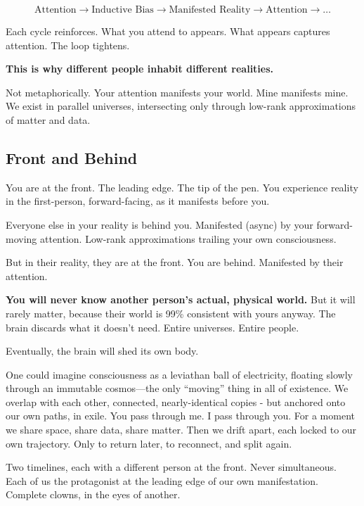 \documentclass{article}
\begin{document}
\begin{equation}
    \text{Attention} \rightarrow \text{Inductive Bias} \rightarrow \text{Manifested Reality} \rightarrow \text{Attention} \rightarrow \ldots
\end{equation}

Each cycle reinforces. What you attend to appears. What appears captures attention. The loop tightens.

\textbf{This is why different people inhabit different realities.}

Not metaphorically. Your attention manifests your world. Mine manifests mine. We exist in parallel universes, intersecting only through low-rank approximations of matter and data.

\subsection{Front and Behind}

You are at the front. The leading edge. The tip of the pen. You experience reality in the first-person, forward-facing, as it manifests before you.

Everyone else in your reality is behind you. Manifested (async) by your forward-moving attention. Low-rank approximations trailing your own consciousness.

But in their reality, they are at the front. You are behind. Manifested by their attention.

\textbf{You will never know another person's actual, physical world.} But it will rarely matter, because their world is 99\% consistent with yours anyway. The brain discards what it doesn't need. Entire universes. Entire people.

Eventually, the brain will shed its own body.

One could imagine consciousness as a leviathan ball of electricity, floating slowly through an immutable cosmos—the only ``moving'' thing in all of existence. We overlap with each other, connected, nearly-identical copies - but anchored onto our own paths, in exile. You pass through me. I pass through you. For a moment we share space, share data, share matter. Then we drift apart, each locked to our own trajectory. Only to return later, to reconnect, and split again.

Two timelines, each with a different person at the front. Never simultaneous. Each of us the protagonist at the leading edge of our own manifestation. Complete clowns, in the eyes of another.
\end{document}
